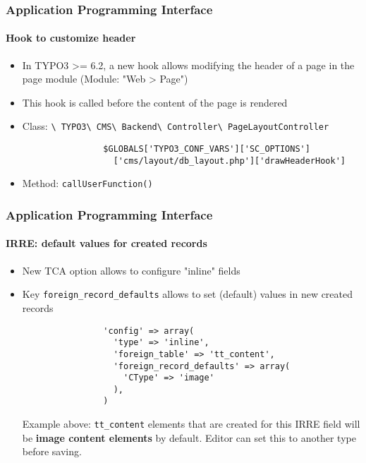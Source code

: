 \begin{frame}[fragile]
	\frametitle{Application Programming Interface}
	\framesubtitle{Hook to customize header}

	\begin{itemize}
		\item In TYPO3 >= 6.2, a new hook allows modifying the header of a page in the page module (Module: "Web > Page")
		\item This hook is called before the content of the page is rendered
		\item Class:\newline
			\smaller
				\texttt{\textbackslash
					TYPO3\textbackslash
					CMS\textbackslash
					Backend\textbackslash
					Controller\textbackslash
					PageLayoutController}\normalsize

			\lstset{
				basicstyle=\smaller\ttfamily
			}

			\begin{lstlisting}
				$GLOBALS['TYPO3_CONF_VARS']['SC_OPTIONS']
				  ['cms/layout/db_layout.php']['drawHeaderHook']
			\end{lstlisting}

		\item Method:\newline
			\smaller
				\texttt{callUserFunction()}

	\end{itemize}

\end{frame}


\begin{frame}[fragile]
	\frametitle{Application Programming Interface}
	\framesubtitle{IRRE: default values for created records}

	\begin{itemize}
		\item New TCA option allows to configure "inline" fields
		\item Key \texttt{foreign\_record\_defaults} allows to set (default) values in new created records

			\begin{lstlisting}
				'config' => array(
				  'type' => 'inline',
				  'foreign_table' => 'tt_content',
				  'foreign_record_defaults' => array(
				    'CType' => 'image'
				  ),
				)
			\end{lstlisting}

			\small
				Example above: \texttt{tt\_content} elements that are created for this IRRE field will be \textbf{image content elements} by default. Editor can set this to another type before saving.
			\normalsize
	\end{itemize}

\end{frame}

